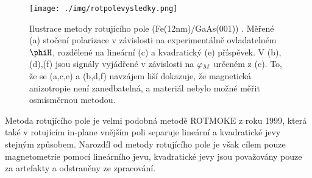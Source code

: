\begin{figure}
    \centering
    \texttt{[image: ./img/rotpolevysledky.png]}
    \caption{Ilustrace metody rotujícího pole (Fe(12nm)/GaAs(001)) \cite{rotpole2}.
    Měřené (a) stočení polarizace v závislosti na experimentálně ovladatelném $\phiH$, rozdělené na lineární (c) a kvadratický (e) příspěvek. V (b),(d),(f) jsou signály vyjádřené v závislosti na $\varphi_M$ určeném z (c). To, že se (a,c,e) a (b,d,f) navzájem liší dokazuje, že magnetická anizotropie není zanedbatelná, a materiál nebylo možné měřit osmisměrnou metodou.}
    \label{f:rotpolevysledky}
\end{figure}

Metoda rotujícího pole je velmi podobná metodě ROTMOKE z roku 1999\cite{ROTMOKE}, která také v rotujícím in-plane vnějším poli separuje lineární a kvadratické jevy stejným způsobem.
Narozdíl od metody rotujícího pole je však cílem pouze magnetometrie pomocí lineárního jevu, kvadratické jevy jsou považovány pouze za artefakty a odstraněny ze zpracování.
